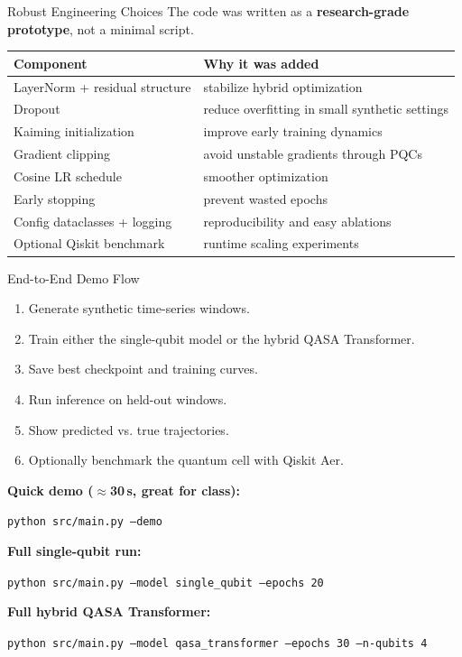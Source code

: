 \documentclass[aspectratio=169,professionalfonts]{beamer}
\begin{document}
\begin{frame}{Robust Engineering Choices}
The code was written as a \textbf{research-grade prototype}, not a minimal script.

\vspace{0.5em}
\begin{center}
\begin{tabular}{ll}
\toprule
Component & Why it was added \\
\midrule
LayerNorm + residual structure & stabilize hybrid optimization \\
Dropout & reduce overfitting in small synthetic settings \\
Kaiming initialization & improve early training dynamics \\
Gradient clipping & avoid unstable gradients through PQCs \\
Cosine LR schedule & smoother optimization \\
Early stopping & prevent wasted epochs \\
Config dataclasses + logging & reproducibility and easy ablations \\
Optional Qiskit benchmark & runtime scaling experiments \\
\bottomrule
\end{tabular}
\end{center}
\end{frame}

\begin{frame}{End-to-End Demo Flow}
\begin{enumerate}
  \item Generate synthetic time-series windows.
  \item Train either the single-qubit model or the hybrid QASA Transformer.
  \item Save best checkpoint and training curves.
  \item Run inference on held-out windows.
  \item Show predicted vs. true trajectories.
  \item Optionally benchmark the quantum cell with Qiskit Aer.
\end{enumerate}

\vspace{0.7em}
\textbf{Quick demo ($\approx$30\,s, great for class):}
\begin{center}
\texttt{python src/main.py --demo}
\end{center}

\textbf{Full single-qubit run:}
\begin{center}
\texttt{python src/main.py --model single\_qubit --epochs 20}
\end{center}

\textbf{Full hybrid QASA Transformer:}
\begin{center}
\texttt{python src/main.py --model qasa\_transformer --epochs 30 --n-qubits 4}
\end{center}
\end{frame}
\end{document}
